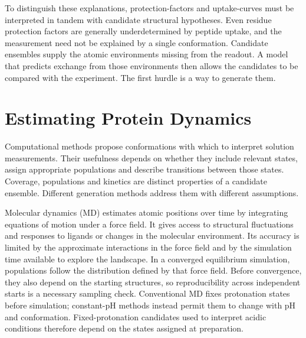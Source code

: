 To distinguish these explanations, protection-factors and uptake-curves must be interpreted in tandem with candidate structural hypotheses. Even residue protection factors are generally underdetermined by peptide uptake,\supercite{skinnerEstimatingConstraintsProtection2019} and the measurement need not be explained by a single conformation.\supercite{bradshawInterpretationHDXData2020} Candidate ensembles supply the atomic environments missing from the readout. A model that predicts exchange from those environments then allows the candidates to be compared with the experiment. The first hurdle is a way to generate them.

\section{Estimating Protein Dynamics}
\label{sec:intro-estimation}

Computational methods propose conformations with which to interpret solution measurements. Their usefulness depends on whether they include relevant states, assign appropriate populations and describe transitions between those states. Coverage, populations and kinetics are distinct properties of a candidate ensemble. Different generation methods address them with different assumptions.

Molecular dynamics (MD) estimates atomic positions over time by integrating equations of motion under a force field. It gives access to structural fluctuations and responses to ligands or changes in the molecular environment. Its accuracy is limited by the approximate interactions in the force field and by the simulation time available to explore the landscape.\supercite{hollingsworthMolecularDynamicsSimulation2018} In a converged equilibrium simulation, populations follow the distribution defined by that force field.\supercite{bmsb2012ch12} Before convergence, they also depend on the starting structures, so reproducibility across independent starts is a necessary sampling check.\supercite{bmsb2012ch2} Conventional MD fixes protonation states before simulation; constant-pH methods instead permit them to change with pH and conformation.\supercite{deoliveiraConstantPHMolecular2022} Fixed-protonation candidates used to interpret acidic conditions therefore depend on the states assigned at preparation.


